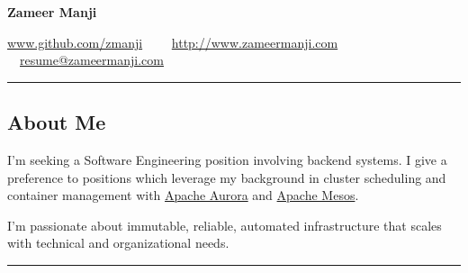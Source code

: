 \documentclass[10pt,letterpaper]{article}
\begin{document}
\begin{center}
{\huge \textbf{Zameer Manji}}


\href{http://www.github.com/zmanji/}{www.github.com/zmanji}\ \ \textbullet
\ \ \href{http://www.zameermanji.com}{http://www.zameermanji.com}\ \ \textbullet
\ \ \href{malto:resume@zameermanji.com}{resume@zameermanji.com}

\end{center}

\hrule
\vspace{-1.0em}
\subsection*{About Me}
\indent I'm seeking a Software Engineering position involving backend systems. I
give a preference to positions which leverage my background in cluster
scheduling and container management with \href{aurora.apache.org}{Apache Aurora}
and \href{mesos.apache.org}{Apache Mesos}.

I'm passionate about immutable, reliable, automated infrastructure that scales
with technical and organizational needs.
\\

\hrule
\vspace{-1.0em}
\end{document}
